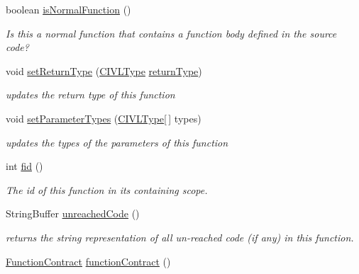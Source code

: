 \begin{DoxyCompactItemize}
boolean \hyperlink{classedu_1_1udel_1_1cis_1_1vsl_1_1civl_1_1model_1_1common_1_1CommonFunction_a6d4b5c569a4fadecbae402b33ab086df}{is\+Normal\+Function} ()
\begin{DoxyCompactList}\small\item\em Is this a normal function that contains a function body defined in the source code? \end{DoxyCompactList}\item 
void \hyperlink{classedu_1_1udel_1_1cis_1_1vsl_1_1civl_1_1model_1_1common_1_1CommonFunction_ab6583402700d23f371a11514ef518948}{set\+Return\+Type} (\hyperlink{interfaceedu_1_1udel_1_1cis_1_1vsl_1_1civl_1_1model_1_1IF_1_1type_1_1CIVLType}{C\+I\+V\+L\+Type} \hyperlink{classedu_1_1udel_1_1cis_1_1vsl_1_1civl_1_1model_1_1common_1_1CommonFunction_a10255f23596c5974e8474769f03a4848}{return\+Type})
\begin{DoxyCompactList}\small\item\em updates the return type of this function \end{DoxyCompactList}\item 
void \hyperlink{classedu_1_1udel_1_1cis_1_1vsl_1_1civl_1_1model_1_1common_1_1CommonFunction_a5382ca53f46e9d4db65291331a0fcaf6}{set\+Parameter\+Types} (\hyperlink{interfaceedu_1_1udel_1_1cis_1_1vsl_1_1civl_1_1model_1_1IF_1_1type_1_1CIVLType}{C\+I\+V\+L\+Type}\mbox{[}$\,$\mbox{]} types)
\begin{DoxyCompactList}\small\item\em updates the types of the parameters of this function \end{DoxyCompactList}\item 
int \hyperlink{classedu_1_1udel_1_1cis_1_1vsl_1_1civl_1_1model_1_1common_1_1CommonFunction_a3d3586d03b844748dd4e6e648da4171a}{fid} ()
\begin{DoxyCompactList}\small\item\em The id of this function in its containing scope. \end{DoxyCompactList}\item 
String\+Buffer \hyperlink{classedu_1_1udel_1_1cis_1_1vsl_1_1civl_1_1model_1_1common_1_1CommonFunction_a07b46fc11c33a5597684784dd28edcea}{unreached\+Code} ()
\begin{DoxyCompactList}\small\item\em returns the string representation of all un-\/reached code (if any) in this function. \end{DoxyCompactList}\item 
\hyperlink{interfaceedu_1_1udel_1_1cis_1_1vsl_1_1civl_1_1model_1_1IF_1_1contract_1_1FunctionContract}{Function\+Contract} \hyperlink{classedu_1_1udel_1_1cis_1_1vsl_1_1civl_1_1model_1_1common_1_1CommonFunction_aa6b3f2c2adf185d95962c4781dab2638}{function\+Contract} ()

\end{DoxyCompactItemize}

